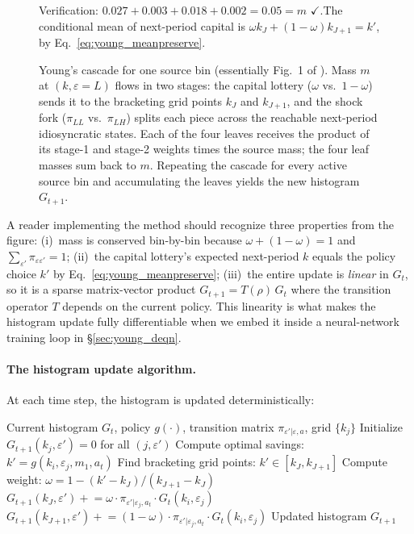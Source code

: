 \documentclass[11pt,a4paper]{report}
\begin{document}
\begin{figure}[ht]
\smallskip
{\footnotesize Verification: $0.027 + 0.003 + 0.018 + 0.002 = 0.05 = m$ $\checkmark$.\quad The conditional mean of next-period capital is $\omega k_J + (1-\omega) k_{J+1} = k'$, by Eq.~\eqref{eq:young_meanpreserve}.}
\caption{Young's cascade for one source bin (essentially Fig.~1 of \citet{young2010}).  Mass $m$ at $(k, \varepsilon{=}L)$ flows in two stages: the capital lottery ($\omega$ vs.~$1-\omega$) sends it to the bracketing grid points $k_J$ and $k_{J+1}$, and the shock fork ($\pi_{LL}$ vs.~$\pi_{LH}$) splits each piece across the reachable next-period idiosyncratic states.  Each of the four leaves receives the product of its stage-1 and stage-2 weights times the source mass; the four leaf masses sum back to $m$.  Repeating the cascade for every active source bin and accumulating the leaves yields the new histogram $G_{t+1}$.}
\label{fig:young_cascade}
\end{figure}

A reader implementing the method should recognize three properties from the figure: (i)~mass is conserved bin-by-bin because $\omega + (1-\omega) = 1$ and $\sum_{\varepsilon'} \pi_{\varepsilon\varepsilon'} = 1$; (ii)~the capital lottery's expected next-period $k$ equals the policy choice $k'$ by Eq.~\eqref{eq:young_meanpreserve}; (iii)~the entire update is \emph{linear} in $G_t$, so it is a sparse matrix-vector product $G_{t+1} = T(\rho)\,G_t$ where the transition operator $T$ depends on the current policy.  This linearity is what makes the histogram update fully differentiable when we embed it inside a neural-network training loop in \S\ref{sec:young_deqn}.

\paragraph{The histogram update algorithm.}
At each time step, the histogram is updated deterministically:

\begin{algorithm}[H]
\caption{Young's histogram update at time $t$}
\label{alg:young}
\begin{algorithmic}
\REQUIRE Current histogram $G_t$, policy $g(\cdot)$, transition matrix $\pi_{\varepsilon'|\varepsilon,a}$, grid $\{k_j\}$
\STATE Initialize $G_{t+1}(k_j, \varepsilon') = 0$ for all $(j, \varepsilon')$
    \STATE Compute optimal savings: $k' = g(k_i, \varepsilon_j, m_1, a_t)$
    \STATE Find bracketing grid points: $k' \in [k_J, k_{J+1}]$
    \STATE Compute weight: $\omega = 1 - (k' - k_J)/(k_{J+1} - k_J)$
        \STATE $G_{t+1}(k_J, \varepsilon') \mathrel{+}= \omega \cdot \pi_{\varepsilon'|\varepsilon_j, a_t}\cdot G_t(k_i, \varepsilon_j)$
        \STATE $G_{t+1}(k_{J+1}, \varepsilon') \mathrel{+}= (1-\omega) \cdot \pi_{\varepsilon'|\varepsilon_j, a_t}\cdot G_t(k_i, \varepsilon_j)$
    \ENDFOR
\ENDFOR
\RETURN Updated histogram $G_{t+1}$
\end{algorithmic}
\end{algorithm}
\end{document}
